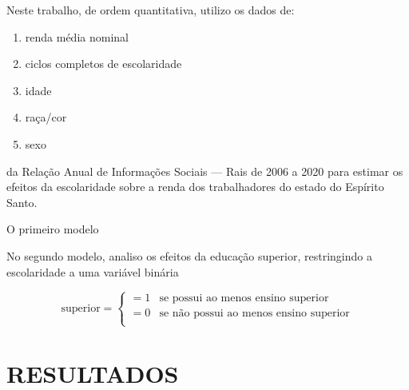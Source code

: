 \documentclass[
  12pt,
  letterpaper,
  DIV=11,
  numbers=noendperiod]{scrartcl}
\providecommand{\tightlist}{%
  \setlength{\itemsep}{0pt}\setlength{\parskip}{0pt}}\usepackage{longtable,booktabs,array}
\begin{document}
Neste trabalho, de ordem quantitativa, utilizo os dados de:

\begin{enumerate}
\def\labelenumi{\arabic{enumi}.}
\tightlist
\item
  renda média nominal
\item
  ciclos completos de escolaridade
\item
  idade
\item
  raça/cor
\item
  sexo
\end{enumerate}

da Relação Anual de Informações Sociais --- Rais de 2006 a 2020 para
estimar os efeitos da escolaridade sobre a renda dos trabalhadores do
estado do Espírito Santo.

O primeiro modelo

No segundo modelo, analiso os efeitos da educação superior, restringindo
a escolaridade a uma variável binária

\[
\text{superior}=
\begin{cases}
    =1 & \text{se possui ao menos ensino superior} \\
    =0 & \text{se não possui ao menos ensino superior} \\
\end{cases}
\]

\hypertarget{resultados}{%
\section{RESULTADOS}\label{resultados}}
\end{document}
